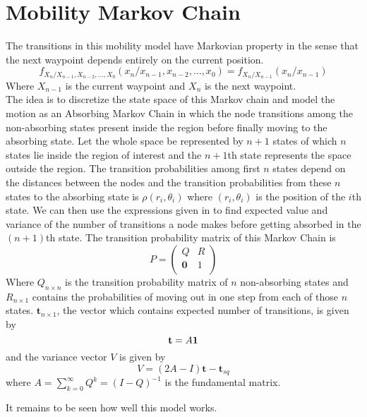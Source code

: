 \chapter{Mobility Markov Chain}
	The transitions in this mobility model have Markovian property in the sense that the next waypoint depends entirely on the current position. 
\begin{equation*}
	f_{X_n/X_{n-1},X_{n-2},\ldots,X_0}(x_n/x_{n-1},x_{n-2},\ldots,x_{0}) = f_{X_n/X_{n-1}}(x_n/x_{n-1})
\end{equation*}
Where $X_{n-1}$ is the current waypoint and $X_n$ is the next waypoint. \\
	The idea is to discretize the state space of this Markov chain and model the motion as an Absorbing Markov Chain in which the node transitions among the non-absorbing states present inside the region before finally moving to the absorbing state. 
Let the whole space be represented by $n+1$ states of which $n$ states lie inside the region of interest and the $n+1$th state represents the space outside the region. The transition probabilities among first $n$ states depend on the distances between the nodes and the transition probabilities from these $n$ states to the absorbing state is $\rho(r_i,\theta_i)$ where $(r_i,\theta_i)$ is the position of the $i$th state. We can then use the expressions given in \cite{wiki:markovWiki}
to find expected value and variance of the number of transitions a node makes before getting absorbed in the $(n+1)$th state. The transition probability matrix of this Markov Chain is  
\begin{equation*}
	P  = \left(
	\begin{array}{cc}
	Q & R \\
		\mathbf{0} & 1 \\
	\end{array} \right)
\end{equation*}
	Where $Q_{n \times n}$ is the transition probability matrix of $n$ non-absorbing states and $R_{n\times1}$ contains the probabilities of moving out in one step from each of those $n$ states. 
	 $\mathbf{t}_{n \times 1}$, the vector which contains expected number of transitions, is given by
\begin{equation*}
	\mathbf{t} = A\mathbf{1} \\
\end{equation*}
and the variance vector $V$ is given by
\begin{equation*}
	 V = (2A-I)\mathbf{t} - \mathbf{t}_{sq}
\end{equation*}
where $A = \sum_{k=0}^{\infty} Q^k = (I-Q)^{-1}$ is the fundamental matrix.

	It remains to be seen how well this model works.
